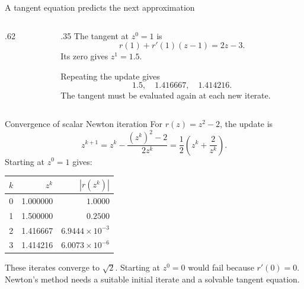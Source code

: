 \documentclass[11pt,aspectratio=169]{beamer}
\begin{document}
\begin{frame}{A tangent equation predicts the next approximation}
\begin{columns}[c,onlytextwidth]
\begin{column}{.62\textwidth}
\centering
{}
\end{column}
\begin{column}{.35\textwidth}
The tangent at $z^0=1$ is
\[
r(1)+r'(1)(z-1)=2z-3.
\]
Its zero gives $z^1=1.5$.

Repeating the update gives
\[
1.5,\quad1.416667,\quad1.414216.
\]
The tangent must be evaluated again at each new iterate.
\end{column}
\end{columns}
\end{frame}

\begin{frame}{Convergence of scalar Newton iteration}
For $r(z)=z^2-2$, the update is
\[
z^{k+1}=z^k-\frac{(z^k)^2-2}{2z^k}
=\frac12\left(z^k+\frac2{z^k}\right).
\]
Starting at $z^0=1$ gives:
\begin{center}
\setlength{\tabcolsep}{12pt}
\begin{tabular}{crr}
\toprule
$k$ & $z^k$ & $|r(z^k)|$\\
\midrule
0 & 1.000000 & $1.0000$\\
1 & 1.500000 & $0.2500$\\
2 & 1.416667 & $6.9444\times10^{-3}$\\
3 & 1.414216 & $6.0073\times10^{-6}$\\
\bottomrule
\end{tabular}
\end{center}
These iterates converge to $\sqrt2$. Starting at $z^0=0$ would fail because
$r'(0)=0$. Newton's method needs a suitable initial iterate and a solvable
tangent equation.
\end{frame}
\end{document}
